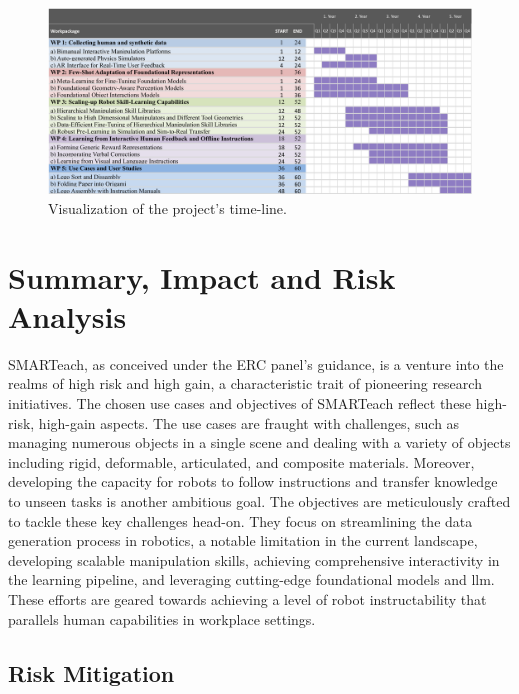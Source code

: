 \documentclass{erc-B2}
\begin{document}
\begin{figure}
    \centering
    \includegraphics[width=1\linewidth]{img/gantt/gantt_chart.png}
    \caption{Visualization of the project's time-line.
    }
    \label{fig:gantt}
\end{figure}


\section{Summary, Impact and Risk Analysis}

SMARTeach, as conceived under the ERC panel's guidance, is a venture into the realms of high risk and high gain, a characteristic trait of pioneering research initiatives. The chosen use cases and objectives of SMARTeach reflect these high-risk, high-gain aspects. The use cases are fraught with challenges, such as managing numerous objects in a single scene and dealing with a variety of objects including rigid, deformable, articulated, and composite materials. Moreover, developing the capacity for robots to follow instructions and transfer knowledge to unseen tasks is another ambitious goal. The objectives are meticulously crafted to tackle these key challenges head-on. They focus on streamlining the data generation process in robotics, a notable limitation in the current landscape, developing scalable manipulation skills, achieving comprehensive interactivity in the learning pipeline, and leveraging cutting-edge foundational models and \gls*{llm}. These efforts are geared towards achieving a level of robot instructability that parallels human capabilities in workplace settings. 

\subsection{Risk Mitigation}
\end{document}
